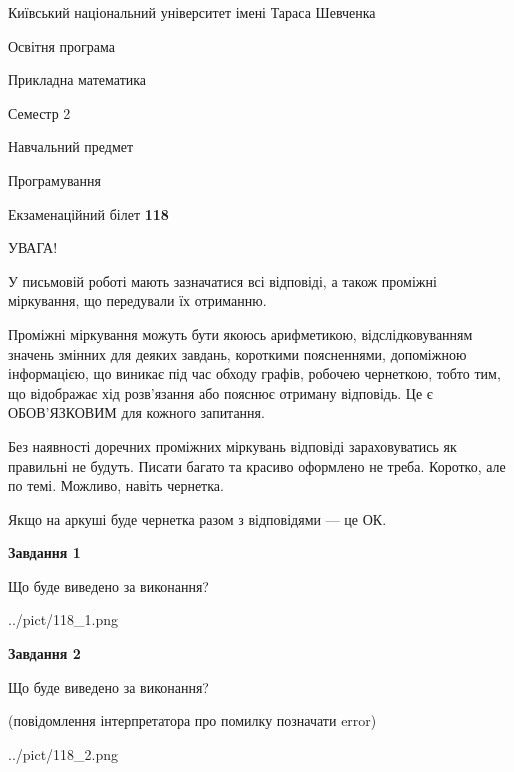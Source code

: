 \documentclass[12pt, ukrainian]{article}
\begin{document}
{{\begin {small}\par
{ \center  Київський національний університет імені Тараса Шевченка \par}
{\parbox {5 cm}{Освітня програма \hfill}{\parbox {7 cm}{Прикладна математика\hfill}}\parbox {6 cm}{\hfill Семестр 2}}\par
{\parbox {5 cm} {Навчальний предмет \hfill}\parbox {7 cm}{Програмування \hfill}\parbox {6cm}{\hfill}\par}\vspace{-7pt} \end{small}}{\center Екзаменаційний білет \No \textbf
{ 118 }\par}}
{
\begin {large}
УВАГА!

У письмовій роботі мають зазначатися всі відповіді, а також проміжні міркування, що передували їх отриманню.

Проміжні міркування можуть бути якоюсь арифметикою, відслідковуванням зна\-чень змінних для деяких завдань,
короткими поясненнями, допоміжною інформацією, що виникає під час обходу графів, робочею чернеткою,
тобто тим, що відображає хід розв’язання або пояснює отриману відповідь.
Це є ОБОВ’ЯЗКОВИМ для кожного запитання.

Без наявності доречних проміжних міркувань відповіді зараховуватись як правиль\-ні не будуть.
Писати багато та красиво оформлено не треба. Коротко, але по темі. Можли\-во, навіть чернетка.

Якщо на аркуші буде чернетка разом з відповідями --- це ОК.

\newpage

{\begin {center}\textbf{Завдання 1}\end {center}}\par
Що буде виведено за виконання?\par
\begin{center}
	{../pict/118_1.png}
\end{center}
\newpage

{\begin {center}\textbf{Завдання 2}\end {center}}\par
Що буде виведено за виконання?\par
 (повідомлення інтерпретатора про помилку позначати error)\par
\begin{center}
	{../pict/118_2.png}
\end{center}
\newpage


\end{large}}
\end{document}
